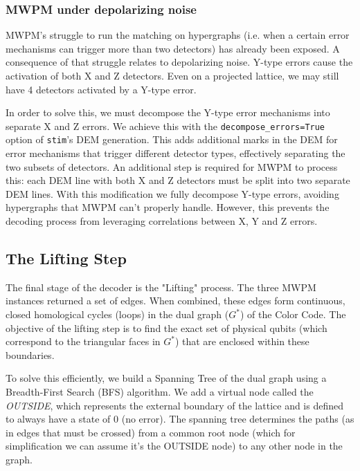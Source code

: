 \subsubsection{MWPM under depolarizing noise}
MWPM's struggle to run the matching on hypergraphs (i.e. when a certain error mechanisms can trigger more than two detectors) has already been exposed. A consequence of that struggle relates to depolarizing noise. Y-type errors cause the activation of both X and Z detectors. Even on a projected lattice, we may still have 4 detectors activated by a Y-type error. 

In order to solve this, we must decompose the Y-type error mechanisms into separate X and Z errors. We achieve this with the \texttt{decompose\_errors=True} option of \texttt{stim}'s DEM generation. This adds additional marks in the DEM for error mechanisms that trigger different detector types, effectively separating the two subsets of detectors. An additional step is required for MWPM to process this: each DEM line with both X and Z detectors must be split into two separate DEM lines. With this modification we fully decompose Y-type errors, avoiding hypergraphs that MWPM can't properly handle. However, this prevents the decoding process from leveraging correlations between X, Y and Z errors.

\subsection{The Lifting Step}
The final stage of the decoder is the "Lifting" process. The three MWPM instances returned a set of edges. When combined, these edges form continuous, closed homological cycles (loops) in the dual graph ($G^*$) of the Color Code. The objective of the lifting step is to find the exact set of physical qubits (which correspond to the triangular faces in $G^*$) that are enclosed within these boundaries.

 To solve this efficiently, we build a Spanning Tree of the dual graph using a Breadth-First Search (BFS) algorithm. We add a virtual node called the \textit{OUTSIDE}, which represents the external boundary of the lattice and is defined to always have a state of $0$ (no error). The spanning tree determines the paths (as in edges that must be crossed) from a common root node (which for simplification we can assume it's the OUTSIDE node) to any other node in the graph.

